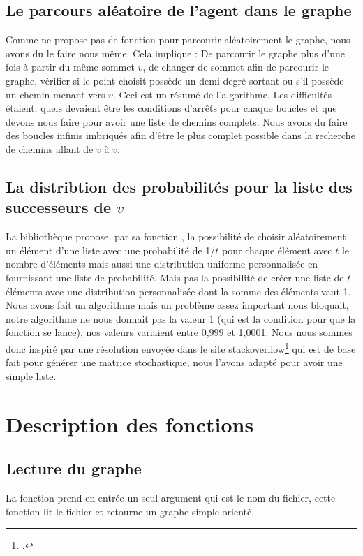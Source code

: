 \documentclass[a4paper, 11pt, oneside]{article}
\begin{document}
			\subsection{Le parcours aléatoire de l'agent dans le graphe}
				Comme  ne propose pas de fonction pour parcourir aléatoirement le graphe, nous avons du le faire nous même. Cela implique : De parcourir le graphe plus d'une fois à partir du même sommet $v$, de changer de sommet afin de parcourir le graphe, vérifier si le point choisit possède un demi-degré sortant ou s'il possède un chemin menant vers $v$. Ceci est un résumé de l'algorithme. Les difficultés étaient, quels devaient être les conditions d'arrêts pour chaque boucles et que devons nous faire pour avoir une liste de chemins complets. Nous avons du faire des boucles infinis imbriqués afin d'être le plus complet possible dans la recherche de chemins allant de $v$ à $v$.
				
			\subsection{La distribtion des probabilités pour la liste des successeurs de $v$}
				La bibliothèque  propose, par sa fonction , la possibilité de choisir aléatoirement un élément d'une liste avec une probabilité de 1/$t$ pour chaque élément avec $t$ le nombre d'éléments mais aussi une distribution uniforme personnalisée en fournissant une liste de probabilité. Mais pas la possibilité de créer une liste de $t$ éléments avec une distribution personnalisée dont la somme des éléments vaut 1. Nous avons fait un algorithme mais un problème assez important nous bloquait, notre algorithme ne nous donnait pas la valeur 1 (qui est la condition pour que la fonction  se lance), nos valeurs variaient entre 0,999 et 1,0001. Nous nous sommes donc inspiré par une résolution envoyée dans le site stackoverflow\footcite{sta} qui est de base fait pour générer une matrice stochastique, nous l'avons adapté pour avoir une simple liste.

	\section{Description des fonctions}	
	
		\subsection{Lecture du graphe}
			La fonction  prend en entrée un seul argument qui est le nom du fichier, cette fonction lit le fichier et retourne un graphe simple orienté.
			
\end{document}
